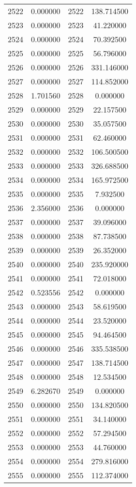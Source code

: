 \documentclass[12pt]{article}
\begin{document}
\begin{longtable}{@{}cccc@{}}
2522 & 0.000000 & 2522 & 138.714500 \\
2523 & 0.000000 & 2523 & 41.220000 \\
2524 & 0.000000 & 2524 & 70.392500 \\
2525 & 0.000000 & 2525 & 56.796000 \\
2526 & 0.000000 & 2526 & 331.146000 \\
2527 & 0.000000 & 2527 & 114.852000 \\
2528 & 1.701560 & 2528 & 0.000000 \\
2529 & 0.000000 & 2529 & 22.157500 \\
2530 & 0.000000 & 2530 & 35.057500 \\
2531 & 0.000000 & 2531 & 62.460000 \\
2532 & 0.000000 & 2532 & 106.500500 \\
2533 & 0.000000 & 2533 & 326.688500 \\
2534 & 0.000000 & 2534 & 165.972500 \\
2535 & 0.000000 & 2535 & 7.932500 \\
2536 & 2.356000 & 2536 & 0.000000 \\
2537 & 0.000000 & 2537 & 39.096000 \\
2538 & 0.000000 & 2538 & 87.738500 \\
2539 & 0.000000 & 2539 & 26.352000 \\
2540 & 0.000000 & 2540 & 235.920000 \\
2541 & 0.000000 & 2541 & 72.018000 \\
2542 & 0.523556 & 2542 & 0.000000 \\
2543 & 0.000000 & 2543 & 58.619500 \\
2544 & 0.000000 & 2544 & 23.520000 \\
2545 & 0.000000 & 2545 & 94.464500 \\
2546 & 0.000000 & 2546 & 335.538500 \\
2547 & 0.000000 & 2547 & 138.714500 \\
2548 & 0.000000 & 2548 & 12.534500 \\
2549 & 6.282670 & 2549 & 0.000000 \\
2550 & 0.000000 & 2550 & 134.820500 \\
2551 & 0.000000 & 2551 & 34.140000 \\
2552 & 0.000000 & 2552 & 57.294500 \\
2553 & 0.000000 & 2553 & 44.760000 \\
2554 & 0.000000 & 2554 & 279.816000 \\
2555 & 0.000000 & 2555 & 112.374000 \\

\end{longtable}
\end{document}
